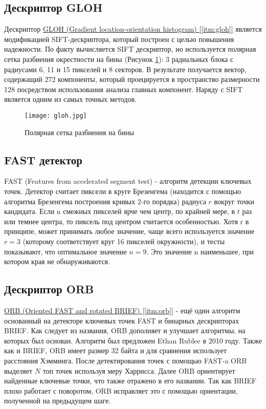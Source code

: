 \subsection{Дескриптор GLOH}

Дескриптор \hyperref[itm:gloh]{ GLOH (Gradient location-orientation histogram) [\ref{itm:gloh}]} является модификацией SIFT-дескриптора, который построен с целью повышения надежности. По факту вычисляется SIFT дескриптор, но используется полярная сетка разбиения окрестности на бины (Рисунок \ref{fig:gloh}): 3 радиальных блока с радиусами 6, 11 и 15 пикселей и 8 секторов. В результате получается вектор, содержащий 272 компоненты, который проецируется в пространство размерности 128 посредством использования анализа главных компонент. Наряду с SIFT является одним из самых точных методов.

\begin{figure}[h]
    \centering
    \texttt{[image: gloh.jpg]}
    \caption{Полярная сетка разбиения на бины}
    \label{fig:gloh}
\end{figure}

\subsection{FAST детектор}

FAST (Features from accelerated segment test) - алгоритм детекции ключевых точек. Детектор считает пиксели в круге Брезенгема (находится с помощью алгоритма Брезенгема построения кривых 2-го порядка) радиуса $r$ вокруг точки кандидата. Если n смежных пикселей ярче чем центр, по крайней мере, в $t$ раз или темнее центра, то пиксель под центром считается особенностью. Хотя r в принципе, может принимать любое значение, чаще всего используется значение $r=3$  (которому соответствует круг 16 пикселей окружности), и тесты показывают, что оптимальное значение $n=9$. Это значение n наименьшее, при котором края не обнаруживаются.

\subsection{Дескриптор ORB}

\hyperref[itm:orb]{ ORB (Oriented FAST and rotated BRIEF) [\ref{itm:orb}]} - ещё один алгоритм основанный на детекторе ключевых точек FAST и бинарных дескрипторах BRIEF. Как следует из названия, ORB дополняет и улучшает алгоритмы, на которых был основан. Алгоритм был предложен Ethan Rublee в 2010 году. Также как и BRIEF, ORB имеет размер 32 байта и для сравнения использует расстояния Хэмминга. После детектирования точек с помощью FAST-a ORB выделяет $N$ топ точек используя меру Харрисса. Далее ORB ориентирует найденные ключевые точки, что также отражено в его названии. Так как BRIEF плохо работает с поворотом, ORB исправляет это с помощью ориентации, полученной на предыдущем шаге.

